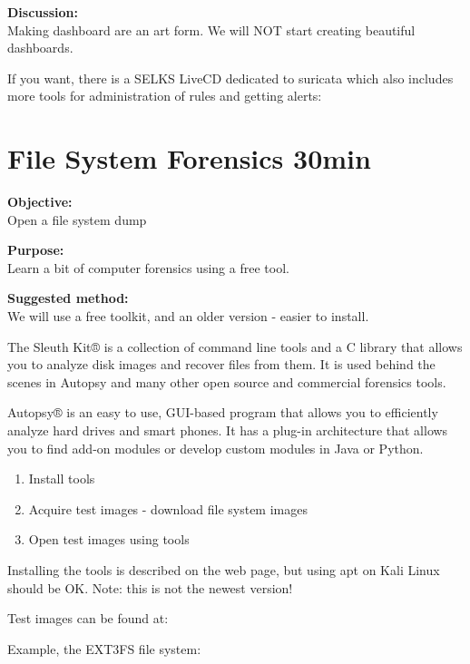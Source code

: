 \documentclass[a4paper,11pt,notitlepage]{report}
\begin{document}
{\bf Discussion:}\\
Making dashboard are an art form. We will NOT start creating beautiful dashboards.

If you want, there is a SELKS LiveCD dedicated to suricata which also includes more tools for administration of rules and getting alerts:\\


\chapter{File System Forensics 30min}
\label{ex:file-system-forensics}

{\bf Objective:}\\
 Open a file system dump

{\bf Purpose:}\\
Learn a bit of computer forensics using a free tool.

{\bf Suggested method:}\\
We will use a free toolkit, and an older version - easier to install.

The Sleuth Kit® is a collection of command line tools and a C library that allows you to analyze disk images and recover files from them. It is used behind the scenes in Autopsy and many other open source and commercial forensics tools.

Autopsy® is an easy to use, GUI-based program that allows you to efficiently analyze hard drives and smart phones. It has a plug-in architecture that allows you to find add-on modules or develop custom modules in Java or Python.



\begin{enumerate}
\item Install tools
\item Acquire test images - download file system images
\item Open test images using tools
\end{enumerate}

Installing the tools is described on the web page, but using apt on Kali Linux should be OK. Note: this is not the newest version!

Test images can be found at:\\

Example, the EXT3FS file system:\\
\end{document}
